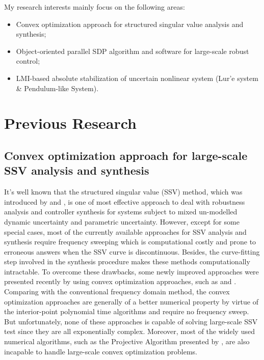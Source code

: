 \documentclass{article}
\begin{document}
My research interests mainly focus on the following areas:
\begin{itemize}
\item
Convex optimization approach for structured singular value analysis and synthesis;
\item
Object-oriented parallel SDP algorithm and software for large-scale robust control;
\item
LMI-based absolute stabilization of uncertain nonlinear system (Lur'e system \& Pendulum-like System).
\end{itemize}

\section{Previous Research}
\subsection{Convex optimization approach for large-scale SSV analysis and synthesis}
It's well known that the structured singular value (SSV) method,
which was introduced by {\citet{Doyle82A}} and {\citet{Safonov82}},
is one of most effective approach to deal with robustness analysis and controller synthesis for systems
subject to mixed un-modelled dynamic uncertainty and parametric uncertainty.
However, except for some special cases, most of the currently available approaches for SSV analysis and synthesis require
frequency sweeping which is computational costly and prone to erroneous answers
when the SSV curve is discontinuous.
Besides, the curve-fitting step involved in the synthesis procedure makes these methods computationally intractable.
To overcome these drawbacks, some newly improved approaches were presented recently by using convex optimization approaches,
such as {\citep{FuB95A}} and {\citep{ChenS98A}}.
Comparing with the conventional frequency domain method,
the convex optimization approaches are generally of a better numerical property
by virtue of the interior-point polynomial time algorithms{\citep{NN94}} and require no frequency sweep.
But unfortunately, none of these approaches is capable of solving large-scale SSV test
since they are all exponentially complex.
Moreover, most of the widely used numerical algorithms,
such as the Projective Algorithm presented by {\citet{Projective}},
are also incapable to handle large-scale convex optimization problems.
\end{document}
